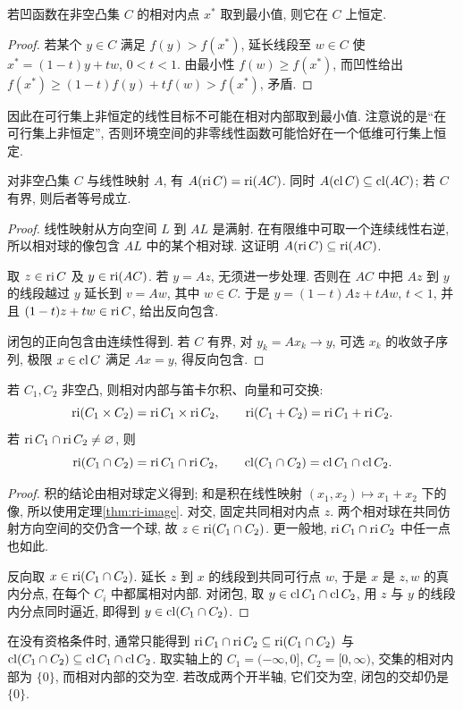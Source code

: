 \begin{proposition}
若凹函数在非空凸集 $C$ 的相对内点 $x^*$ 取到最小值, 则它在 $C$ 上恒定.
\end{proposition}
\begin{proof}
若某个 $y\in C$ 满足 $f(y)>f(x^*)$, 延长线段至 $w\in C$ 使 $x^*=(1-t)y+tw$, $0<t<1$. 由最小性 $f(w)\ge f(x^*)$, 而凹性给出 $f(x^*)\ge(1-t)f(y)+tf(w)>f(x^*)$, 矛盾.
\end{proof}
因此在可行集上非恒定的线性目标不可能在相对内部取到最小值. 注意说的是“在可行集上非恒定”, 否则环境空间的非零线性函数可能恰好在一个低维可行集上恒定.

\begin{theorem}\label{thm:ri-image}
对非空凸集 $C$ 与线性映射 $A$, 有 $A(\operatorname{ri} C)=\operatorname{ri}(AC)$. 同时 $A(\operatorname{cl} C)\subseteq\operatorname{cl}(AC)$; 若 $C$ 有界, 则后者等号成立.
\end{theorem}
\begin{proof}
线性映射从方向空间 $L$ 到 $AL$ 是满射. 在有限维中可取一个连续线性右逆, 所以相对球的像包含 $AL$ 中的某个相对球. 这证明 $A(\operatorname{ri} C)\subseteq\operatorname{ri}(AC)$.

取 $z\in\operatorname{ri} C$ 及 $y\in\operatorname{ri}(AC)$. 若 $y=Az$, 无须进一步处理. 否则在 $AC$ 中把 $Az$ 到 $y$ 的线段越过 $y$ 延长到 $v=Aw$, 其中 $w\in C$. 于是 $y=(1-t)Az+tAw$, $t<1$, 并且 $(1-t)z+tw\in\operatorname{ri} C$, 给出反向包含.

闭包的正向包含由连续性得到. 若 $C$ 有界, 对 $y_k=Ax_k\to y$, 可选 $x_k$ 的收敛子序列, 极限 $x\in\operatorname{cl} C$ 满足 $Ax=y$, 得反向包含.
\end{proof}
\begin{theorem}\label{thm:ri-intersection}
若 $C_1,C_2$ 非空凸, 则相对内部与笛卡尔积、向量和可交换:
\[
\operatorname{ri}(C_1\times C_2)=\operatorname{ri} C_1\times\operatorname{ri} C_2,\qquad
\operatorname{ri}(C_1+C_2)=\operatorname{ri} C_1+\operatorname{ri} C_2.
\]
若 $\operatorname{ri} C_1\cap\operatorname{ri} C_2\ne\varnothing$, 则
\[
\operatorname{ri}(C_1\cap C_2)=\operatorname{ri} C_1\cap\operatorname{ri} C_2,\qquad
\operatorname{cl}(C_1\cap C_2)=\operatorname{cl} C_1\cap\operatorname{cl} C_2.
\]
\end{theorem}
\begin{proof}
积的结论由相对球定义得到; 和是积在线性映射 $(x_1,x_2)\mapsto x_1+x_2$ 下的像, 所以使用定理\ref{thm:ri-image}. 对交, 固定共同相对内点 $z$. 两个相对球在共同仿射方向空间的交仍含一个球, 故 $z\in\operatorname{ri}(C_1\cap C_2)$. 更一般地, $\operatorname{ri} C_1\cap\operatorname{ri} C_2$ 中任一点也如此.

反向取 $x\in\operatorname{ri}(C_1\cap C_2)$. 延长 $z$ 到 $x$ 的线段到共同可行点 $w$, 于是 $x$ 是 $z,w$ 的真内分点, 在每个 $C_i$ 中都属相对内部. 对闭包, 取 $y\in\operatorname{cl} C_1\cap\operatorname{cl} C_2$, 用 $z$ 与 $y$ 的线段内分点同时逼近, 即得到 $y\in\operatorname{cl}(C_1\cap C_2)$.
\end{proof}
在没有资格条件时, 通常只能得到 $\operatorname{ri} C_1\cap\operatorname{ri} C_2\subseteq\operatorname{ri}(C_1\cap C_2)$ 与 $\operatorname{cl}(C_1\cap C_2)\subseteq\operatorname{cl} C_1\cap\operatorname{cl} C_2$. 取实轴上的 $C_1=(-\infty,0]$, $C_2=[0,\infty)$, 交集的相对内部为 $\{0\}$, 而相对内部的交为空. 若改成两个开半轴, 它们交为空, 闭包的交却仍是 $\{0\}$.

